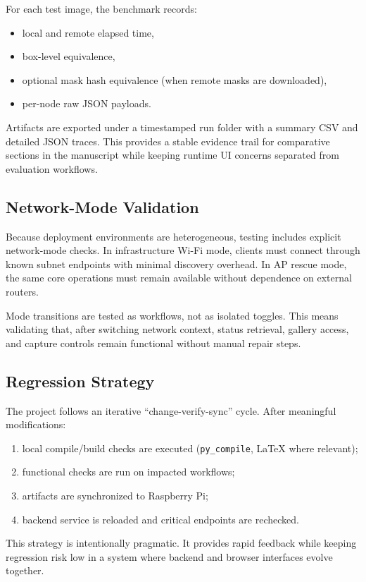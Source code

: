 For each test image, the benchmark records:
\begin{itemize}
  \item local and remote elapsed time,
  \item box-level equivalence,
  \item optional mask hash equivalence (when remote masks are downloaded),
  \item per-node raw JSON payloads.
\end{itemize}

Artifacts are exported under a timestamped run folder with a summary CSV and detailed JSON traces. This provides a stable evidence trail for comparative sections in the manuscript while keeping runtime UI concerns separated from evaluation workflows.

\subsection{Network-Mode Validation}
Because deployment environments are heterogeneous, testing includes explicit network-mode checks. In infrastructure Wi-Fi mode, clients must connect through known subnet endpoints with minimal discovery overhead. In AP rescue mode, the same core operations must remain available without dependence on external routers.

Mode transitions are tested as workflows, not as isolated toggles. This means validating that, after switching network context, status retrieval, gallery access, and capture controls remain functional without manual repair steps.

\subsection{Regression Strategy}
The project follows an iterative ``change-verify-sync'' cycle. After meaningful modifications:
\begin{enumerate}
  \item local compile/build checks are executed (\texttt{py\_compile}, LaTeX where relevant);
  \item functional checks are run on impacted workflows;
  \item artifacts are synchronized to Raspberry Pi;
  \item backend service is reloaded and critical endpoints are rechecked.
\end{enumerate}

This strategy is intentionally pragmatic. It provides rapid feedback while keeping regression risk low in a system where backend and browser interfaces evolve together.

